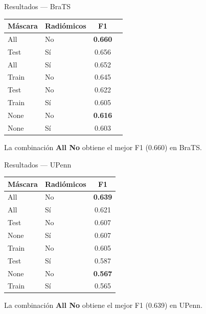 \documentclass[aspectratio=169]{beamer}
\begin{document}
\begin{frame}{Resultados — BraTS}
  \centering
  \begin{tabular}{llcc}
    \toprule
    \textbf{Máscara} & \textbf{Radiómicos} & \textbf{F1} \\
    \midrule
    All   & No & \textbf{0.660} \\
    Test  & Sí & 0.656 \\
    All   & Sí & 0.652 \\
    Train & No & 0.645 \\
    Test  & No & 0.622 \\
    Train & Sí & 0.605 \\
    None  & No & \textbf{0.616} \\
    None  & Sí & 0.603 \\
    \bottomrule
  \end{tabular}

  \vspace{0.8em}
  {\small La combinación \textbf{All No} obtiene el mejor F1 (0.660) en BraTS.}
\end{frame}


\begin{frame}{Resultados — UPenn}
  \centering
  \begin{tabular}{llc}
    \toprule
    \textbf{Máscara} & \textbf{Radiómicos} & \textbf{F1} \\
    \midrule
    All   & No & \textbf{0.639} \\
    All   & Sí & 0.621 \\
    Test  & No & 0.607 \\
    None  & Sí & 0.607 \\
    Train & No & 0.605 \\
    Test  & Sí & 0.587 \\
    None  & No & \textbf{0.567} \\
    Train & Sí & 0.565 \\
    \bottomrule
  \end{tabular}

  \vspace{0.8em}
  {\small La combinación \textbf{All No} obtiene el mejor F1 (0.639) en UPenn.}
\end{frame}
\end{document}
